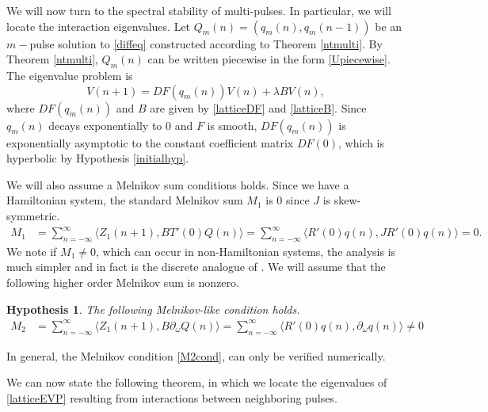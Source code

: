 \documentclass[12pt]{article}
\newtheorem{hypothesis}{Hypothesis}
\begin{document}
We will now turn to the spectral stability of multi-pulses. In particular, we will locate the interaction eigenvalues. Let $Q_m(n) = (q_m(n), q_m(n-1))$ be an $m-$pulse solution to \eqref{diffeq} constructed according to Theorem \ref{ntmulti}. By Theorem \ref{ntmulti}, $Q_m(n)$ can be written piecewise in the form \eqref{Upiecewise}. The eigenvalue problem is
\begin{equation}\label{multiEVP}
V(n+1) = DF(q_m(n)) V(n) + \lambda B V(n),
\end{equation}
where $DF(q_m(n))$ and $B$ are given by \eqref{latticeDF} and \eqref{latticeB}. Since $q_m(n)$ decays exponentially to 0 and $F$ is smooth, $DF(q_m(n))$ is exponentially asymptotic to the constant coefficient matrix $DF(0)$, which is hyperbolic by Hypothesis \ref{initialhyp}. 

We will also assume a Melnikov sum conditions holds. Since we have a Hamiltonian system, the standard Melnikov sum $M_1$ is 0 since $J$ is skew-symmetric.
\begin{align*}
M_1 &= \sum_{n=-\infty}^\infty \langle Z_1(n+1), B T'(0)Q(n) \rangle
= \sum_{n=-\infty}^\infty \langle R'(0)q(n), J R'(0)q(n) \rangle
= 0.
\end{align*}
We note if $M_1 \neq 0$, which can occur in non-Hamiltonian systems, the analysis is much simpler and in fact is the discrete analogue of \cite{Sandstede1998}. We will assume that the following higher order Melnikov sum is nonzero.

\begin{hypothesis}\label{melnikovhyp}
The following Melnikov-like condition holds.
\begin{align}\label{M2cond}
M_2 &= \sum_{n=-\infty}^\infty \langle Z_1(n+1), B \partial_\omega Q(n) \rangle = \sum_{n=-\infty}^\infty \langle R'(0) q(n), \partial_\omega q(n) \rangle \neq 0
\end{align}
\end{hypothesis}
\noindent In general, the Melnikov condition \eqref{M2cond}, can only be verified numerically.

We can now state the following theorem, in which we locate the eigenvalues of \eqref{latticeEVP} resulting from interactions between neighboring pulses.
\end{document}
